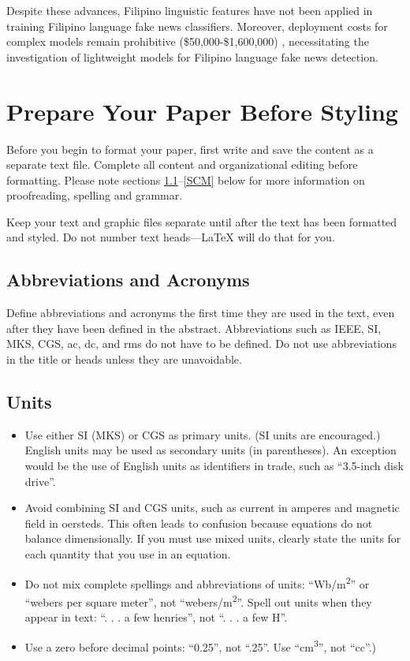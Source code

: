 \documentclass[conference]{IEEEtran}
\begin{document}
Despite these advances, Filipino linguistic features have not been applied in training Filipino language fake news classifiers. Moreover, deployment costs for complex models remain prohibitive (\$50,000-\$1,600,000) \cite{b4}, necessitating the investigation of lightweight models for Filipino language fake news detection.

\section{Prepare Your Paper Before Styling}
Before you begin to format your paper, first write and save the content as a 
separate text file. Complete all content and organizational editing before 
formatting. Please note sections \ref{AA}--\ref{SCM} below for more information on 
proofreading, spelling and grammar.

Keep your text and graphic files separate until after the text has been 
formatted and styled. Do not number text heads---{\LaTeX} will do that 
for you.

\subsection{Abbreviations and Acronyms}\label{AA}
Define abbreviations and acronyms the first time they are used in the text, 
even after they have been defined in the abstract. Abbreviations such as 
IEEE, SI, MKS, CGS, ac, dc, and rms do not have to be defined. Do not use 
abbreviations in the title or heads unless they are unavoidable.

\subsection{Units}
\begin{itemize}
\item Use either SI (MKS) or CGS as primary units. (SI units are encouraged.) English units may be used as secondary units (in parentheses). An exception would be the use of English units as identifiers in trade, such as ``3.5-inch disk drive''.
\item Avoid combining SI and CGS units, such as current in amperes and magnetic field in oersteds. This often leads to confusion because equations do not balance dimensionally. If you must use mixed units, clearly state the units for each quantity that you use in an equation.
\item Do not mix complete spellings and abbreviations of units: ``Wb/m\textsuperscript{2}'' or ``webers per square meter'', not ``webers/m\textsuperscript{2}''. Spell out units when they appear in text: ``. . . a few henries'', not ``. . . a few H''.
\item Use a zero before decimal points: ``0.25'', not ``.25''. Use ``cm\textsuperscript{3}'', not ``cc''.)
\end{itemize}
\end{document}
